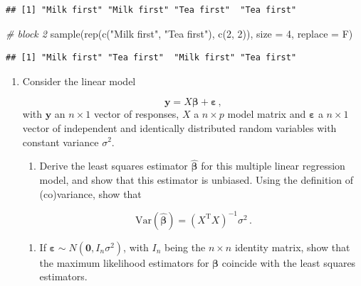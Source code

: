 \documentclass[
]{book}
\newenvironment{Shaded}{\begin{snugshade}}{\end{snugshade}}
\newcommand{\AttributeTok}[1]{\textcolor[rgb]{0.77,0.63,0.00}{#1}}
\newcommand{\CommentTok}[1]{\textcolor[rgb]{0.56,0.35,0.01}{\textit{#1}}}
\newcommand{\DecValTok}[1]{\textcolor[rgb]{0.00,0.00,0.81}{#1}}
\newcommand{\FunctionTok}[1]{\textcolor[rgb]{0.00,0.00,0.00}{#1}}
\newcommand{\NormalTok}[1]{#1}
\newcommand{\StringTok}[1]{\textcolor[rgb]{0.31,0.60,0.02}{#1}}
\providecommand{\tightlist}{%
  \setlength{\itemsep}{0pt}\setlength{\parskip}{0pt}}
\theoremstyle{definition}
\theoremstyle{definition}
\theoremstyle{definition}
\theoremstyle{definition}
\theoremstyle{remark}
\begin{document}
\begin{verbatim}
## [1] "Milk first" "Milk first" "Tea first"  "Tea first"
\end{verbatim}

\begin{Shaded}
\begin{Highlighting}[]
    \CommentTok{\# block 2}
    \FunctionTok{sample}\NormalTok{(}\FunctionTok{rep}\NormalTok{(}\FunctionTok{c}\NormalTok{(}\StringTok{"Milk first"}\NormalTok{, }\StringTok{"Tea first"}\NormalTok{), }\FunctionTok{c}\NormalTok{(}\DecValTok{2}\NormalTok{, }\DecValTok{2}\NormalTok{)), }\AttributeTok{size =} \DecValTok{4}\NormalTok{, }\AttributeTok{replace =}\NormalTok{ F)}
\end{Highlighting}
\end{Shaded}

\begin{verbatim}
## [1] "Milk first" "Tea first"  "Milk first" "Tea first"
\end{verbatim}

\begin{enumerate}
\def\labelenumi{\arabic{enumi}.}
\setcounter{enumi}{1}
\item
  Consider the linear model

  \[\boldsymbol{y}= X\boldsymbol{\beta}+ \boldsymbol{\varepsilon}\,,\]
  with \(\boldsymbol{y}\) an \(n\times 1\) vector of responses, \(X\) a \(n\times p\) model matrix and \(\boldsymbol{\varepsilon}\) a \(n\times 1\) vector of independent and identically distributed random variables with constant variance \(\sigma^2\).

  \begin{enumerate}
  \def\labelenumii{\alph{enumii}.}
  \tightlist
  \item
    Derive the least squares estimator \(\hat{\boldsymbol{\beta}}\) for this multiple linear regression model, and show that this estimator is unbiased. Using the definition of (co)variance, show that
  \end{enumerate}

  \[\mbox{Var}(\hat{\boldsymbol{\beta}}) = \left(X^{\mathrm{T}}X\right)^{-1}\sigma^2\,.\]

  \begin{enumerate}
  \def\labelenumii{\alph{enumii}.}
  \setcounter{enumii}{1}
  \tightlist
  \item
    If \(\boldsymbol{\varepsilon}\sim N (\boldsymbol{0},I_n\sigma^2)\), with \(I_n\) being the \(n\times n\) identity matrix, show that the maximum likelihood estimators for \(\boldsymbol{\beta}\) coincide with the least squares estimators.
  \end{enumerate}
\end{enumerate}
\end{document}
